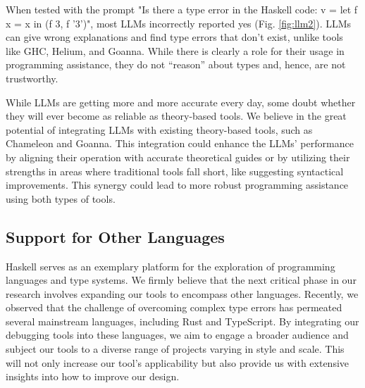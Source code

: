 When tested with the prompt "Is there a type error in the Haskell code: v = let f x = x in (f 3, f '3')", most LLMs incorrectly reported yes (Fig. \ref{fig:llm2}). LLMs can give wrong explanations and find type errors that don't exist, unlike tools like GHC, Helium, and Goanna. While there is clearly a role for their usage in programming assistance, they do not “reason” about types and, hence, are not trustworthy.

While LLMs are getting more and more accurate every day, some doubt whether they will ever become as reliable as theory-based tools. We believe in the great potential of integrating LLMs with existing theory-based tools, such as Chameleon and Goanna. This integration could enhance the LLMs' performance by aligning their operation with accurate theoretical guides or by utilizing their strengths in areas where traditional tools fall short, like suggesting syntactical improvements. This synergy could lead to more robust programming assistance using both types of tools.


\subsection{Support for Other Languages}
Haskell serves as an exemplary platform for the exploration of programming languages and type systems. We firmly believe that the next critical phase in our research involves expanding our tools to encompass other languages. Recently, we observed that the challenge of overcoming complex type errors has permeated several mainstream languages, including Rust  and TypeScript. By integrating our debugging tools into these languages, we aim to engage a broader audience and subject our tools to a diverse range of projects varying in style and scale. This will not only increase our tool's applicability but also provide us with extensive insights into how to improve our design.

